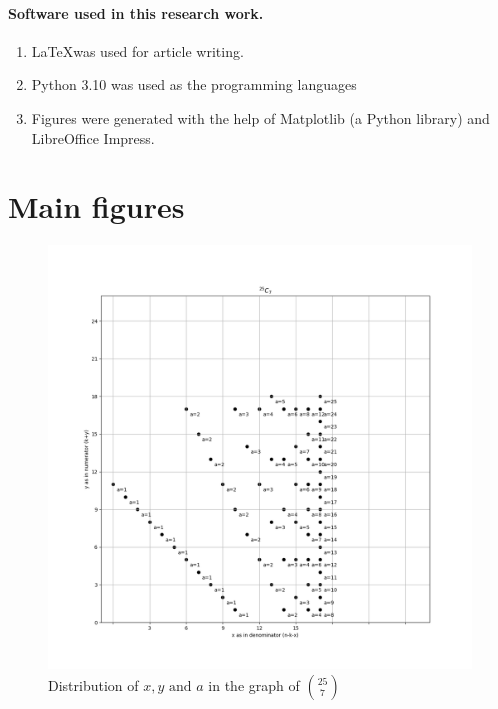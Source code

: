 \documentclass[10pt, twoside]{article}
\newcommand*{\Combination}[2]{\binom{#1}{#2}}%
\begin{document}
\paragraph{Software used in this research work.}
\begin{enumerate}
\item \LaTeX was used for article writing.
\item Python 3.10 was used as the programming languages
\item Figures were generated with the help of Matplotlib (a Python library) and LibreOffice Impress.
\end{enumerate}
\section{Main figures}
\begin{figure}[ph!]
	\includegraphics[width=\linewidth]{25_7_alone.png}
	\caption{Distribution of $x,y \text{ and } a$ in the graph of $\Combination{25}{7}$}
	\label{25_C_7_example}
\end{figure}
\end{document}
